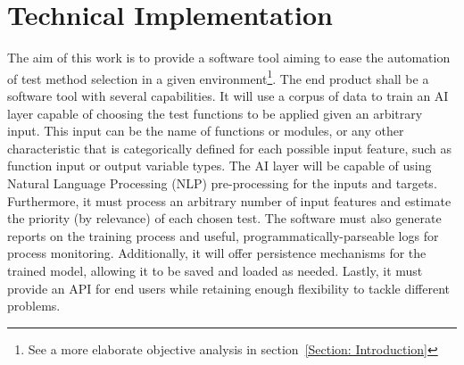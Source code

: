 \documentclass[a4paper, 11pt]{report}
\begin{document}
 \chapter{Technical Implementation}\label{Section: Methodology}
    The aim of this work is to provide a software tool aiming to ease the automation of test method selection in a given environment\footnote{See a more elaborate objective analysis in section~\ref{Section: Introduction}}. The end product shall be a software tool with several capabilities. It will use a corpus of data to train an AI layer capable of choosing the test functions to be applied given an arbitrary input. This input can be the name of functions or modules, or any other characteristic that is categorically defined for each possible input feature, such as function input or output variable types. The AI layer will be capable of using Natural Language Processing (NLP) pre-processing for the inputs and targets. Furthermore, it must process an arbitrary number of input features and estimate the priority (by relevance) of each chosen test. The software must also generate reports on the training process and useful, programmatically-parseable logs for process monitoring. Additionally, it will offer persistence mechanisms for the trained model, allowing it to be saved and loaded as needed. Lastly, it must provide an API for end users while retaining enough flexibility to tackle different problems.
\end{document}
